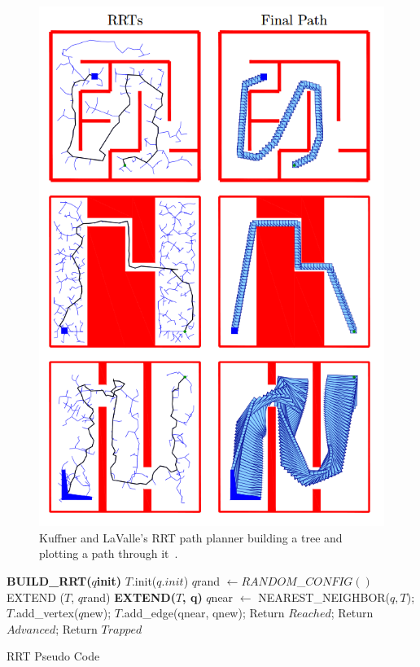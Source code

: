 \documentclass[journal]{IEEEtran}
\begin{document}
	\begin{figure}[h]
		\includegraphics[width=1.0\linewidth]{KuffnerRRT.png}
		\caption{ Kuffner and LaValle's RRT path planner building a tree and plotting a path through it~\cite{Kuffner2000}.}
		\label{KuffnerRRT}
	\end{figure} 
	
	\begin{algorithm}
		\begin{algorithmic}
			\State \hrulefill 
			\State \textbf{ BUILD\_RRT($q$init)}
			\State $T$.init($q.init$)
			\State $q$rand $ \gets  RANDOM$\_$CONFIG() $
			\State EXTEND ($T$, $q$rand)
			\EndFor
			\State \hrulefill
			\State \hrulefill 
			\State \textbf{EXTEND($T$, q)}
			\State $q$near $ \gets $ NEAREST\_NEIGHBOR($q, T$);
			\State $T$.add\_vertex($q$new);
			\State $T$.add\_edge(qnear, qnew);
			\State Return $Reached$;
			\Else
			\State  Return $Advanced$;
			\EndIf
			\State Return $Trapped$
			\EndIf
			\State \hrulefill 
		\end{algorithmic}
		\caption{RRT Pseudo Code}
		\label{RRTPseudocode}
	\end{algorithm}
	
\end{document}
